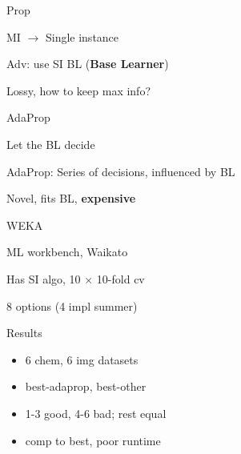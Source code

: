\documentclass[13pt,handout]{beamer}
\newenvironment{wideitemize}{\itemize\addtolength{\itemsep}{20pt}}{\enditemize}
\begin{document}
\begin{frame}{Prop}
\begin{wideitemize}
    \item MI $\to$ Single instance
    \item Adv: use SI BL ({\bf Base Learner})
    \item Lossy, how to keep max info?
\end{wideitemize}
\end{frame}

\begin{frame}{AdaProp}
\begin{wideitemize}
    \item Let the BL decide
    \item AdaProp: Series of decisions, influenced by BL
    \item Novel, fits BL, {\bf expensive}
\end{wideitemize}
\end{frame}

\begin{frame}{WEKA}
\begin{wideitemize}
    \item ML workbench, Waikato
    \item Has SI algo, 10 $\times$ 10-fold cv
    \item 8 options (4 impl summer)
\end{wideitemize}
\end{frame}

\begin{frame}{Results}
\begin{itemize}
    \item 6 chem, 6 img datasets
    \item best-adaprop, best-other
    \item 1-3 good, 4-6 bad; rest equal
    \item comp to best, poor runtime
\end{itemize}
\end{frame}
\end{document}
